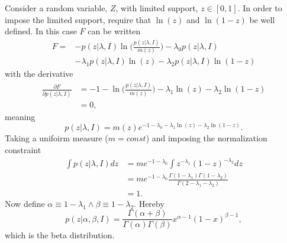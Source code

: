 \begin{example}
	Consider a random variable, $Z$, with limited support, $z\in [0,1]$. In order to impose the limited support, require that $\ln(z)$ and $\ln(1-z)$ be well defined. In this case $F$ can be written\label{ex:beta}
	\begin{equation}
		\begin{split}
			F =& -p(z|\lambda,I)\ln\bigg(\frac{p(z|\lambda,I)}{m(z)}\bigg)-\lambda_0p(z|\lambda,I)\\
			&-\lambda_1p(z|\lambda,I)\ln(z)-\lambda_2p(z|\lambda,I)\ln(1-z)
		\end{split}
	\end{equation}
	with the derivative
	\begin{equation}
		\begin{split}
			\frac{\partial F}{\partial p(z|\lambda,I)} &= -1-\ln\bigg(\frac{p(z|\lambda,I)}{m(z)}\bigg)-\lambda_1\ln(z)-\lambda_2\ln(1-z)\\
			&=0,
		\end{split}
	\end{equation}
	meaning
	\begin{equation}
		p(z|\lambda,I)=m(z)e^{-1-\lambda_0-\lambda_1\ln(z)-\lambda_2\ln(1-z)}.
	\end{equation}
	Taking a unifoirm measure ($m= const$) and imposing the normalization constraint
	\begin{equation}
		\begin{split}
			\int p(z|\lambda,I) dz &= me^{-1-\lambda_0}\int z^{-\lambda_1}(1-z)^{-\lambda_2}dz\\
			&= me^{-1-\lambda_0}\frac{\Gamma(1-\lambda_1)\Gamma(1-\lambda_2)}{\Gamma(2-\lambda_1-\lambda_2)}\\
			&=1.
		\end{split}
	\end{equation}
	Now define $\alpha \equiv 1-\lambda_1\wedge \beta \equiv 1-\lambda_2$. Hereby
	\begin{equation}
		p(z|\alpha,\beta,I) = \frac{\Gamma(\alpha+\beta)}{\Gamma(\alpha)\Gamma(\beta)}x^{\alpha-1}(1-x)^{\beta-1},
	\end{equation}
	which is the beta distribution. 
\end{example}